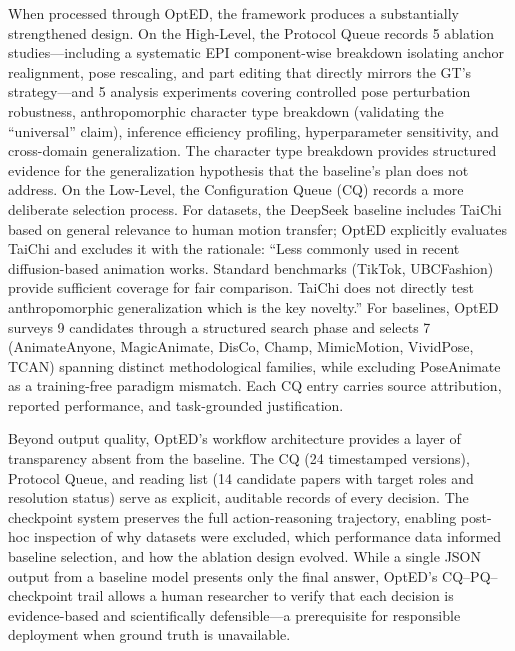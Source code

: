 When processed through OptED, the framework produces a substantially strengthened design. On the High-Level, the Protocol Queue records 5 ablation studies---including a systematic EPI component-wise breakdown isolating anchor realignment, pose rescaling, and part editing that directly mirrors the GT's strategy---and 5 analysis experiments covering controlled pose perturbation robustness, anthropomorphic character type breakdown (validating the ``universal'' claim), inference efficiency profiling, hyperparameter sensitivity, and cross-domain generalization. The character type breakdown provides structured evidence for the generalization hypothesis that the baseline's plan does not address. On the Low-Level, the Configuration Queue (CQ) records a more deliberate selection process. For datasets, the DeepSeek baseline includes TaiChi based on general relevance to human motion transfer; OptED explicitly evaluates TaiChi and excludes it with the rationale: ``Less commonly used in recent diffusion-based animation works. Standard benchmarks (TikTok, UBCFashion) provide sufficient coverage for fair comparison. TaiChi does not directly test anthropomorphic generalization which is the key novelty.'' For baselines, OptED surveys 9 candidates through a structured search phase and selects 7 (AnimateAnyone, MagicAnimate, DisCo, Champ, MimicMotion, VividPose, TCAN) spanning distinct methodological families, while excluding PoseAnimate as a training-free paradigm mismatch. Each CQ entry carries source attribution, reported performance, and task-grounded justification.

Beyond output quality, OptED's workflow architecture provides a layer of transparency absent from the baseline. The CQ (24 timestamped versions), Protocol Queue, and reading list (14 candidate papers with target roles and resolution status) serve as explicit, auditable records of every decision. The checkpoint system preserves the full action-reasoning trajectory, enabling post-hoc inspection of why datasets were excluded, which performance data informed baseline selection, and how the ablation design evolved. While a single JSON output from a baseline model presents only the final answer, OptED's CQ--PQ--checkpoint trail allows a human researcher to verify that each decision is evidence-based and scientifically defensible---a prerequisite for responsible deployment when ground truth is unavailable.

